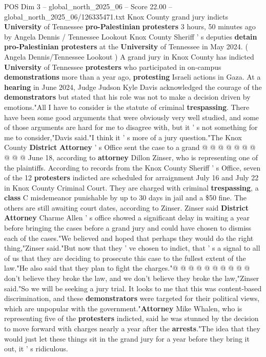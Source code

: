 \begin{textsample}{POS Dim 3 – global\_north\_2025\_06 – Score 22.00 – global\_north\_2025\_06/126335471.txt}  \label{ex:f3_pos_107}
Knox County grand jury indicts \textbf{University} of Tennessee \textbf{pro-Palestinian} \textbf{protesters} 3 hours, 50 minutes ago by Angela Dennis / Tennessee Lookout Knox County Sheriff ' s deputies \textbf{detain} \textbf{pro-Palestinian} \textbf{protesters} at the \textbf{University} of Tennessee in May 2024. ( Angela Dennis/Tennessee Lookout ) A grand jury in Knox County has indicted \textbf{University} of Tennessee \textbf{protesters} who participated in on-campus \textbf{demonstrations} more than a year ago, \textbf{protesting} Israeli actions in Gaza.
At a \textbf{hearing} in June 2024, Judge Judson Kyle Davis acknowledged the courage of the \textbf{demonstrators} but stated that his role was not to make a decision driven by emotions."All I have to consider is the statute of criminal \textbf{trespassing}.
There have been some good arguments that were obviously very well studied, and some of those arguments are hard for me to disagree with, but it ' s not something for me to consider,"Davis said."I think it ' s more of a jury question."The Knox County \textbf{District} \textbf{Attorney} ' s Office sent the case to a grand @ @ @ @ @ @ @ @ @ @ June 18, according to \textbf{attorney} Dillon Zinser, who is representing one of the plaintiffs.
According to records from the Knox County Sheriff ' s Office, seven of the 12 \textbf{protesters} indicted are scheduled for arraignment July 16 and July 22 in Knox County Criminal Court.
They are charged with criminal \textbf{trespassing}, a \textbf{class} C misdemeanor punishable by up to 30 days in jail and a \$50 fine.
The others are still awaiting court dates, according to Zinser.
Zinser said \textbf{District} \textbf{Attorney} Charme Allen ' s office showed a significant delay in waiting a year before bringing the cases before a grand jury and could have chosen to dismiss each of the cases."We believed and hoped that perhaps they would do the right thing,"Zinser said."But now that they ' ve chosen to indict, that ' s a signal to all of us that they are deciding to prosecute this case to the fullest extent of the law."He also said that they plan to fight the charges."@ @ @ @ @ @ @ @ @ @ don't believe they broke the law, and we don't believe they broke the law,"Zinser said."So we will be seeking a jury trial.
It looks to me that this was content-based discrimination, and these \textbf{demonstrators} were targeted for their political views, which are unpopular with the government."\textbf{Attorney} Mike Whalen, who is representing five of the \textbf{protesters} indicted, said he was stunned by the decision to move forward with charges nearly a year after the \textbf{arrests}."The idea that they would just let these things sit in the grand jury for a year before they bring it out, it ' s ridiculous.

\end{textsample}
